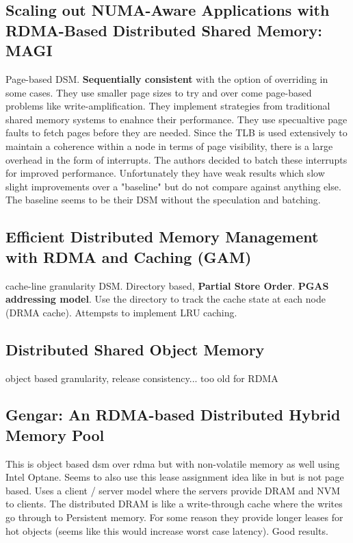 \documentclass[sigplan,nonacm]{acmart}
\begin{document}
    \subsection{Scaling out NUMA-Aware Applications with RDMA-Based Distributed Shared Memory: MAGI}
    Page-based DSM. \textbf{Sequentially consistent} with the option of overriding in some cases. They use 
    smaller page sizes to try and over come page-based problems like write-amplification. They implement 
    strategies from traditional shared memory systems to enahnce their performance. They use specualtive 
    page faults to fetch pages before they are needed. Since the TLB is used extensively to maintain 
    a coherence within a node in terms of page visibility, there is a large overhead in the form of interrupts.
    The authors decided to batch these interrupts for improved performance. Unfortunately they have weak results
    which slow slight improvements over a "baseline" but do not compare against anything else. The baseline seems to be 
    their DSM without the speculation and batching.\cite{Hong-JCST-2019}

    \subsection{Efficient Distributed Memory Management with RDMA and Caching (GAM) }
    cache-line granularity DSM. Directory based, \textbf{Partial Store Order}. \textbf{PGAS addressing model}. 
    Use the directory to track the cache state at each node (DRMA cache). Attempsts to implement LRU 
    caching.  \cite{Cai-VLDB-2018}

    \subsection{Distributed Shared Object Memory}
    object based granularity, release consistency... too old for RDMA\cite{Guedes-WWOSIII-1993} %

    \subsection{Gengar: An RDMA-based Distributed Hybrid Memory Pool}
    This is object based dsm over rdma but with non-volatile memory as well using Intel Optane. Seems to 
    also use this lease assignment idea like in \cite{Endo-IPDRM-2020} but is not page based. Uses a client / 
    server model where the servers provide DRAM and NVM to clients. The distributed DRAM is like a write-through 
    cache where the writes go through to Persistent memory. For some reason they provide longer leases 
    for hot objects (seems like this would increase worst case latency). Good results. \cite{Duan-ICDCS-2021}
\end{document}
